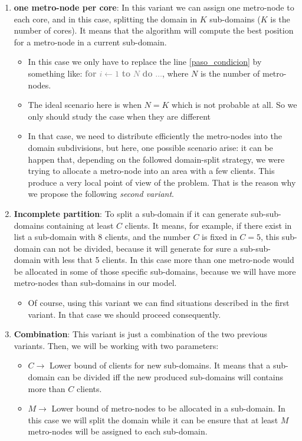 \begin{enumerate}
\item {\bf one metro-node per core}: In this variant we can assign one metro-node to each core, and in this case, splitting the domain in $K$ sub-domains ($K$ is the number of cores). It means that the algorithm will compute the best position for a metro-node in a current sub-domain. \label{var1}
\begin{itemize}
\item In this case we only have to replace the line \ref{paso_condicion} by something like:  \textcolor{gray}{{\bf for} $i \leftarrow 1$ {\bf to} $N$ {\bf do} $\dots$}, 
where $N$ is the number of metro-nodes.
\item The ideal scenario here is when $N = K$ which is not probable at all. So we only should study the case when they are different
\item In that case, we need to distribute efficiently the metro-nodes into the domain subdivisions, but here, one possible scenario arise: it can be happen that, depending on the followed domain-split strategy, we were trying to allocate a metro-node into an area with a few clients. This produce a very local point of view of the problem. That is the reason why we propose the following \textit{second variant}.
\end{itemize}
\item {\bf Incomplete partition}: To split a sub-domain if it can generate sub-sub-domains containing at least $C$ clients. It means, for example, if there exist in list a sub-domain with 8 clients, and the number $C$ is fixed in $C = 5$, this sub-domain can not be divided, because it will generate for sure a sub-sub-domain with less that 5 clients. In this case more than one metro-node would be allocated in some of those specific sub-domains, because we will have more metro-nodes than sub-domains in our model.\label{var2}
\begin{itemize}
\item Of course, using this variant we can find situations described in the first variant. In that case we should proceed consequently.
\end{itemize}
\item {\bf Combination}: This variant is just a combination of the two previous variants. Then, we will be working with two parameters: \label{var3}
\begin{itemize}
\item $C \rightarrow$ Lower bound of clients for new sub-domains. It means that a sub-domain can be divided iff the new produced sub-domains will contains more than $C$ clients.
\item $M \rightarrow$ Lower bound of metro-nodes to be allocated in a sub-domain. In this case we will split the domain while it can be ensure that at least $M$ metro-nodes will be assigned to each sub-domain.
\end{itemize}
\end{enumerate}

